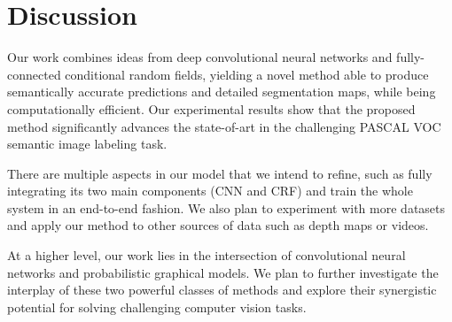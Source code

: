 \section{Discussion}
\label{sec:discussion}

Our work combines ideas from deep convolutional neural networks and
fully-connected conditional random fields, yielding a novel method able to
produce semantically accurate predictions and detailed segmentation maps,
while being computationally efficient. Our experimental results show that the
proposed method significantly advances the state-of-art in the challenging
PASCAL VOC semantic image labeling task.

There are multiple aspects in our model that we intend to refine, such as
fully integrating its two main components (CNN and CRF) and train the whole
system in an end-to-end fashion. We also plan to experiment with more datasets
and apply our method to other sources of data such as depth maps or videos.

At a higher level, our work lies in the intersection of convolutional neural
networks and probabilistic graphical models. We plan to further investigate
the interplay of these two powerful classes of methods and explore their
synergistic potential for solving challenging computer vision tasks.
